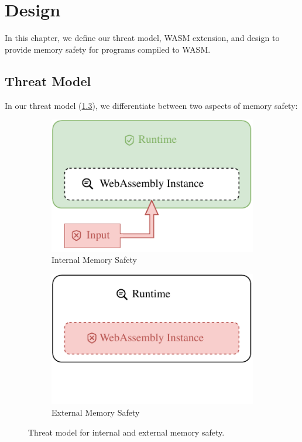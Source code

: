 \chapter{Design}
\label{ch:design}

In this chapter, we define our threat model, \ac{WASM} extension, and design to provide memory safety for programs compiled to \ac{WASM}.

\section{Threat Model}
\label{sec:threat-model}

In our threat model (\cref{fig:threat-model}), we differentiate between two aspects of memory safety:

\begin{figure}
    \centering
    \begin{subfigure}[T]{0.45\textwidth}
        \centering
        \includegraphics{figures/build/wasm-internal-mem-safety}
        \caption{Internal Memory Safety}
        \label{fig:internal-mem-safety}
    \end{subfigure}
    \hfill
    \begin{subfigure}[T]{0.45\textwidth}
        \centering
        \includegraphics{figures/build/wasm-external-mem-safety}
        \hspace{\fill}
        \caption{External Memory Safety}
        \label{fig:external-mem-safety}
    \end{subfigure}
    \caption{Threat model for internal and external memory safety.}
    \label{fig:threat-model}
\end{figure}

